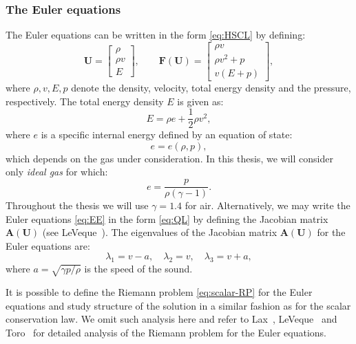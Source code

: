 \subsubsection*{The Euler equations}

The Euler equations can be written in the form \eqref{eq:HSCL} by defining:
\begin{equation} \label{eq:EE}
\mathbf{U} = \begin{bmatrix} \rho \\ \rho v \\ E \end{bmatrix},
\qquad
\mathbf{F(U)} = \begin{bmatrix} \rho v \\ \rho v^2 + p \\ v(E+p) \end{bmatrix},
\end{equation}
where $ \rho, v, E, p $ denote the density, velocity, total energy density and the pressure, respectively. The total energy density $ E $ is given as:
\begin{equation}
E = \rho e + \frac{1}{2} \rho v^2,
\end{equation}
where $ e $ is a specific internal energy defined by an equation of state:
\begin{equation}
e = e \left( \rho, p \right),
\end{equation}
which depends on the gas under consideration. In this thesis, we will consider only \textit{ideal gas} for which:
\begin{equation}
e = \frac{p}{\rho \left( \gamma - 1 \right)}.
\end{equation}
Throughout the thesis we will use $ \gamma = 1.4 $ for air. Alternatively, we may write the Euler equations \eqref{eq:EE} in the form \eqref{eq:QL} by defining the Jacobian matrix $ \mathbf{A(U)} $ (see LeVeque~\cite[p.~300]{lev02}). The eigenvalues of the Jacobian matrix $ \mathbf{A(U)} $ for the Euler equations are:
\begin{equation}
\lambda_1 = v - a, \quad \lambda_2 = v, \quad \lambda_3 = v + a,
\end{equation}
where $ a = \sqrt{\gamma p / \rho} $ is the speed of the sound. 
\begin{remark}
\textup{It is possible to define the Riemann problem \eqref{eq:scalar-RP} for the Euler equations and study structure of the solution in a similar fashion as for the scalar conservation law. We omit such analysis here and refer to Lax~\cite{lax72}, LeVeque~\cite{lev01} and Toro~\cite{tor09} for detailed analysis of the Riemann problem for the Euler equations.}
\end{remark}

